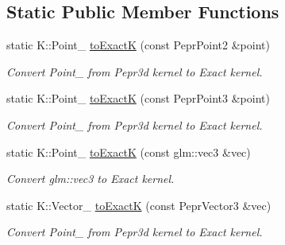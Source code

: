 \subsection*{Static Public Member Functions}
\begin{DoxyCompactItemize}
\item 
\mbox{\label{classpepr3d_1_1_triangle_detail_adeb9f4f75d811ad26309a4638bced4b0}} 
static K\+::\+Point\+\_ \mbox{\hyperlink{classpepr3d_1_1_triangle_detail_adeb9f4f75d811ad26309a4638bced4b0}{to\+ExactK}} (const Pepr\+Point2 \&point)
\begin{DoxyCompactList}\small\item\em Convert Point\+\_ from Pepr3d kernel to Exact kernel. \end{DoxyCompactList}\item 
\mbox{\label{classpepr3d_1_1_triangle_detail_afa092868a47bbadc6e4d48f4d985bfab}} 
static K\+::\+Point\+\_ \mbox{\hyperlink{classpepr3d_1_1_triangle_detail_afa092868a47bbadc6e4d48f4d985bfab}{to\+ExactK}} (const Pepr\+Point3 \&point)
\begin{DoxyCompactList}\small\item\em Convert Point\+\_ from Pepr3d kernel to Exact kernel. \end{DoxyCompactList}\item 
\mbox{\label{classpepr3d_1_1_triangle_detail_a1bab79b6e5843936aef0c47620a888ec}} 
static K\+::\+Point\+\_ \mbox{\hyperlink{classpepr3d_1_1_triangle_detail_a1bab79b6e5843936aef0c47620a888ec}{to\+ExactK}} (const glm\+::vec3 \&vec)
\begin{DoxyCompactList}\small\item\em Convert glm\+::vec3 to Exact kernel. \end{DoxyCompactList}\item 
\mbox{\label{classpepr3d_1_1_triangle_detail_a12c5b966586348c4dc96bba207ec9926}} 
static K\+::\+Vector\+\_ \mbox{\hyperlink{classpepr3d_1_1_triangle_detail_a12c5b966586348c4dc96bba207ec9926}{to\+ExactK}} (const Pepr\+Vector3 \&vec)
\begin{DoxyCompactList}\small\item\em Convert Point\+\_ from Pepr3d kernel to Exact kernel. \end{DoxyCompactList}\item 

\end{DoxyCompactItemize}
